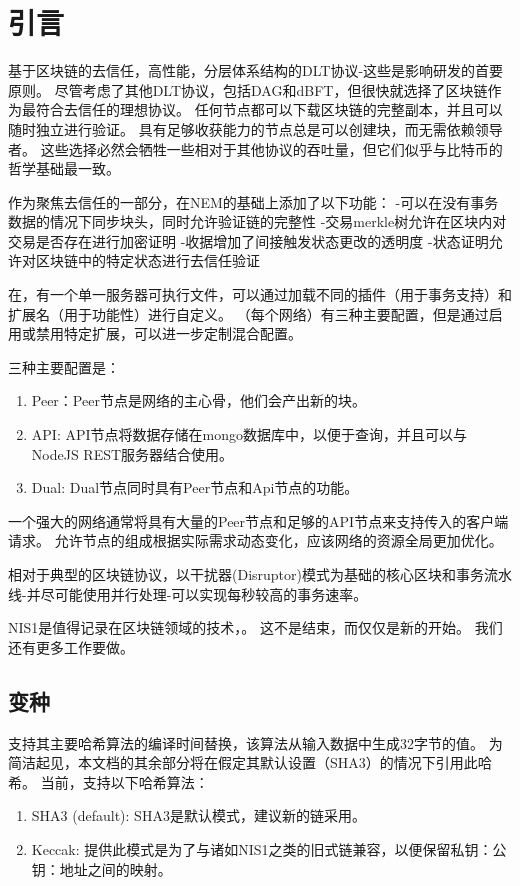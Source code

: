 \section{引言}
\label{sec:introduction}


基于区块链的去信任，高性能，分层体系结构的DLT协议-这些是影响\codename 研发的首要原则。
尽管考虑了其他DLT协议，包括DAG和dBFT，但很快就选择了区块链作为最符合去信任的理想协议。
任何节点都可以下载区块链的完整副本，并且可以随时独立进行验证。
具有足够收获能力的节点总是可以创建块，而无需依赖领导者。
这些选择必然会牺牲一些相对于其他协议的吞吐量，但它们似乎与比特币的哲学基础最一致。

作为聚焦去信任的一部分，在NEM的基础上添加了以下功能：
-可以在没有事务数据的情况下同步块头，同时允许验证链的完整性
-交易merkle树允许在区块内对交易是否存在进行加密证明
-收据增加了间接触发状态更改的透明度
-状态证明允许对区块链中的特定状态进行去信任验证

在，有一个单一服务器可执行文件，可以通过加载不同的插件（用于事务支持）和扩展名（用于功能性）进行自定义。
（每个网络）有三种主要配置，但是通过启用或禁用特定扩展，可以进一步定制混合配置。

三种主要配置是：
\begin{enumerate}
\item Peer：Peer节点是网络的主心骨，他们会产出新的块。
\item API: API节点将数据存储在mongo数据库中，以便于查询，并且可以与NodeJS REST服务器结合使用。
\item Dual: Dual节点同时具有Peer节点和Api节点的功能。
\end{enumerate}


一个强大的网络通常将具有大量的Peer节点和足够的API节点来支持传入的客户端请求。
允许节点的组成根据实际需求动态变化，应该网络的资源全局更加优化。

相对于典型的区块链协议，以干扰器(Disruptor)模式为基础的核心区块和事务流水线-并尽可能使用并行处理-可以实现每秒较高的事务速率。


NIS1是值得记录在区块链领域的技术，。
这不是结束，而仅仅是新的开始。
我们还有更多工作要做。

\subsection{变种}

\codenamespace 支持其主要哈希算法的编译时间替换，该算法从输入数据中生成32字节的值。
为简洁起见，本文档的其余部分将在假定其默认设置（SHA3）的情况下引用此哈希。
当前，支持以下哈希算法：

\begin{enumerate}
\item SHA3 (default): SHA3是默认模式，建议新的链采用。
\item Keccak: 提供此模式是为了与诸如NIS1之类的旧式链兼容，以便保留私钥：公钥：地址之间的映射。
\end{enumerate}
